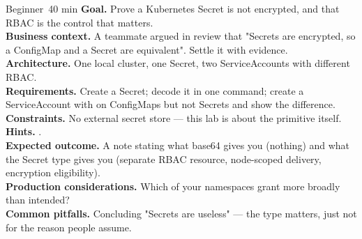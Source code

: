 
\begin{minilab}{Beginner}{~40 min}
\textbf{Goal.} Prove a Kubernetes Secret is not encrypted, and that RBAC is the control that matters.\\
\textbf{Business context.} A teammate argued in review that "Secrets are encrypted, so a ConfigMap and a Secret are equivalent". Settle it with evidence.\\
\textbf{Architecture.} One local cluster, one Secret, two ServiceAccounts with different RBAC.\\
\textbf{Requirements.} Create a Secret; decode it in one command; create a ServiceAccount with  on ConfigMaps but not Secrets and show the difference.\\
\textbf{Constraints.} No external secret store --- this lab is about the primitive itself.\\
\textbf{Hints.} .\\
\textbf{Expected outcome.} A note stating what base64 gives you (nothing) and what the Secret type gives you (separate RBAC resource, node-scoped delivery, encryption eligibility).\\
\textbf{Production considerations.} Which of your namespaces grant  more broadly than intended?\\
\textbf{Common pitfalls.} Concluding "Secrets are useless" --- the type matters, just not for the reason people assume.
\end{minilab}

